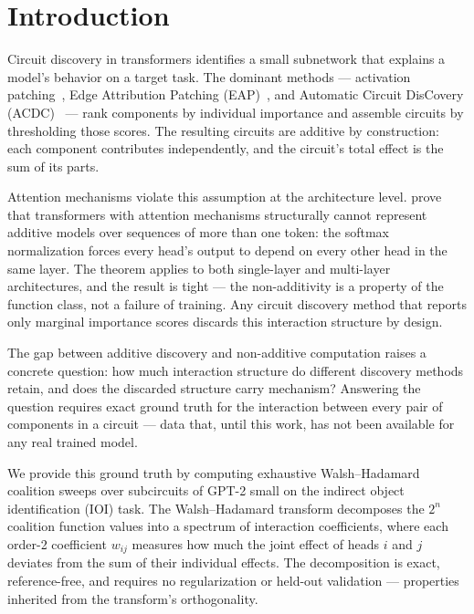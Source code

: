 %
%

\section{Introduction}
\label{sec:introduction}

Circuit discovery in transformers identifies a small subnetwork that
explains a model's behavior on a target task. The dominant methods ---
activation patching~\citep{wang2022ioi}, Edge Attribution Patching
(EAP)~\citep{syed2023attribution}, and Automatic Circuit DisCovery
(ACDC)~\citep{conmy2023acdc} --- rank components by individual
importance and assemble circuits by thresholding those scores. The
resulting circuits are additive by construction: each component
contributes independently, and the circuit's total effect is the sum of
its parts.

Attention mechanisms violate this assumption at the architecture level.
\citet{leemann2024slalom} prove that transformers with attention
mechanisms structurally cannot represent additive models over sequences
of more than one token: the softmax normalization forces every head's
output to depend on every other head in the same layer. The theorem
applies to both single-layer and multi-layer architectures, and the
result is tight --- the non-additivity is a property of the function
class, not a failure of training. Any circuit discovery method that
reports only marginal importance scores discards this interaction
structure by design.

The gap between additive discovery and non-additive computation raises a
concrete question: how much interaction structure do different discovery
methods retain, and does the discarded structure carry mechanism? Answering
the question requires exact ground truth for the interaction between every pair
of components in a circuit --- data that, until this work, has not been
available for any real trained model.

We provide this ground truth by computing exhaustive Walsh--Hadamard
coalition sweeps over subcircuits of GPT-2 small on the indirect object
identification (IOI) task. The Walsh--Hadamard transform decomposes the
$2^n$ coalition function values into a spectrum of interaction
coefficients, where each order-2 coefficient $w_{ij}$ measures how much
the joint effect of heads $i$ and $j$ deviates from the sum of their
individual effects. The decomposition is exact, reference-free, and
requires no regularization or held-out validation --- properties
inherited from the transform's orthogonality.

